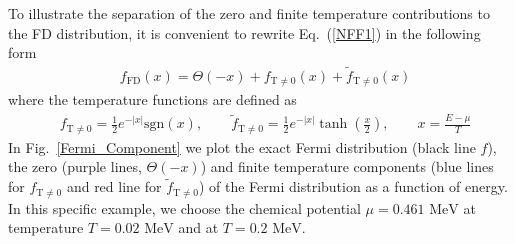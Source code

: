 \documentclass[sn-mathphys,Numbered]{sn-jnl}
\newcommand*{\MeV}{\text{ MeV}}
\newcommand*{\xmagenta}{\color{magenta}}
\begin{document}
To illustrate the separation of the zero and finite temperature contributions to the FD distribution, it is convenient to rewrite Eq.~(\ref{NFF1}) in the following form
\begin{align}\label{Eq_form}
&f_\mathrm{FD}(x)=\Theta(-x)+f_\mathrm{T\neq0}(x)+\widetilde f_\mathrm{T\neq0}(x)
\end{align}
where the temperature functions are defined as
\begin{align}\label{eq:f_T_nonzero_def}
&f_\mathrm{T\neq0}=\frac{1}{2}e^{ -|x| }\mathrm{sgn}\left(x\right),\qquad
\widetilde f_\mathrm{T\neq0}=\frac{1}{2}e^{ - |x| }\tanh\left(\frac{x}{2}\right),\qquad x=\frac{E-\mu}{T}
\end{align}
In Fig.~\ref{Fermi_Component} we plot the exact Fermi distribution (black line $f$), the zero (purple lines, $\Theta(-x)$) and finite temperature components (blue lines for $f_\mathrm{T\neq0}$ and red line for $\widetilde f_\mathrm{T\neq0}$) of the Fermi distribution as a function of energy. In this specific example, we choose the chemical potential $\mu=0.461\MeV$ at temperature $T=0.02\MeV$ and at $T=0.2\MeV$.
\end{document}
